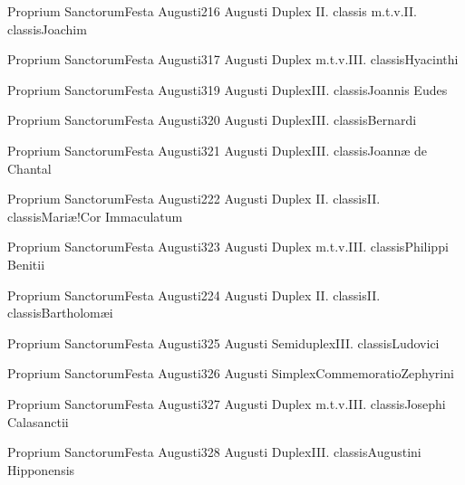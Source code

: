 \documentclass[psalterium-feriale.tex]{subfiles}
\begin{document}
	{Proprium Sanctorum}{Festa Augusti}{2}{16 Augusti}
	{Duplex II. classis m.t.v.}{II. classis}{Joachim}
	{}
	{}
\psalmodiapropria

	{Proprium Sanctorum}{Festa Augusti}{3}{17 Augusti}
	{Duplex m.t.v.}{III. classis}{Hyacinthi}
	{}
	{}
\COPObRubric

	{Proprium Sanctorum}{Festa Augusti}{3}{19 Augusti}
	{Duplex}{III. classis}{Joannis Eudes}
	{}
	{}
\COPObRubric

	{Proprium Sanctorum}{Festa Augusti}{3}{20 Augusti}
	{Duplex}{III. classis}{Bernardi}
	{}
	{}
\COPOcRubric

	{Proprium Sanctorum}{Festa Augusti}{3}{21 Augusti}
	{Duplex}{III. classis}{Joannæ de Chantal}
	{}
	{}
\MUNNaRubric

	{Proprium Sanctorum}{Festa Augusti}{2}{22 Augusti}
	{Duplex II. classis}{II. classis}{Mariæ!Cor Immaculatum}
	{}
	{}
\psalmodiapropria

	{Proprium Sanctorum}{Festa Augusti}{3}{23 Augusti}
	{Duplex m.t.v.}{III. classis}{Philippi Benitii}
	{}
	{}
\COPObRubric

	{Proprium Sanctorum}{Festa Augusti}{2}{24 Augusti}
	{Duplex II. classis}{II. classis}{Bartholomæi}
	{}
	{}
\psalmodiapropria

	{Proprium Sanctorum}{Festa Augusti}{3}{25 Augusti}
	{Semiduplex}{III. classis}{Ludovici}
	{}
	{}
\COPOaRubric

	{Proprium Sanctorum}{Festa Augusti}{3}{26 Augusti}
	{Simplex}{Commemoratio}{Zephyrini}
	{}
	{}
\UMEXaRubric

	{Proprium Sanctorum}{Festa Augusti}{3}{27 Augusti}
	{Duplex m.t.v.}{III. classis}{Josephi Calasanctii}
	{}
	{}
\COPObRubric

	{Proprium Sanctorum}{Festa Augusti}{3}{28 Augusti}
	{Duplex}{III. classis}{Augustini Hipponensis}
	{}
	{}
\COPOcRubric
\end{document}
